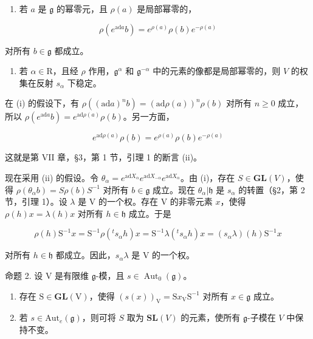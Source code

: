 \begin{enumerate}
\def\labelenumi{(\roman{enumi})}
\tightlist
\item
  若 \(a\) 是 \(\mathfrak{g}\) 的幂零元，且 \(\rho(a)\) 是局部幂零的，
\end{enumerate}

\[
\rho (e ^ {\mathrm{ad} a} b) = e ^ {\rho (a)} \rho (b) e ^ {- \rho (a)}
\]

对所有 \(b \in \mathfrak{g}\) 都成立。

\begin{enumerate}
\def\labelenumi{(\roman{enumi})}
\setcounter{enumi}{1}
\tightlist
\item
  若 \(\alpha \in \mathrm{R}\)，且经 \(\rho\) 作用，\(\mathfrak{g}^{\alpha}\) 和 \(\mathfrak{g}^{-\alpha}\) 中的元素的像都是局部幂零的，则 \(V\) 的权集在反射 \(s_{\alpha}\) 下稳定。
\end{enumerate}

在 (i) 的假设下，有 \(\rho((\mathrm{ad}a)^n b) = (\mathrm{ad}\rho(a))^n\rho(b)\) 对所有 \(n\geq 0\) 成立，所以 \(\rho(e^{\mathrm{ad}a}b) = e^{\mathrm{ad}\rho(a)}\rho(b)\)。另一方面，

\[
e ^ {\mathrm{ad} \rho (a)} \rho (b) = e ^ {\rho (a)} \rho (b) e ^ {- \rho (a)}
\]

这就是第 VII 章，§3，第 1 节，引理 1 的断言 (ii)。

现在采用 (ii) 的假设。令 \(\theta_{\alpha} = e^{\mathrm{ad}X_{\alpha}}e^{\mathrm{ad}X_{-\alpha}}e^{\mathrm{ad}X_{\alpha}}\)。由 (i)，存在 \(S\in \mathbf{GL}(V)\)，使得 \(\rho (\theta_{\alpha}b) = S\rho (b)S^{-1}\) 对所有 \(b\in \mathfrak{g}\) 成立。现在 \(\theta_{\alpha}|\mathfrak{h}\) 是 \(s_{\alpha}\) 的转置（§2，第 2 节，引理 1）。设 \(\lambda\) 是 V 的一个权。存在 V 的非零元素 \(x\)，使得 \(\rho (h)x = \lambda (h)x\) 对所有 \(h\in \mathfrak{h}\) 成立。于是

\[
\rho (h) \mathrm{S} ^ {- 1} x = \mathrm{S} ^ {- 1} \rho (^ {t} s _ {\alpha} h) x = \mathrm{S} ^ {- 1} \lambda (^ {t} s _ {\alpha} h) x = (s _ {\alpha} \lambda) (h) \mathrm{S} ^ {- 1} x
\]

对所有 \(h \in \mathfrak{h}\) 都成立。因此，\(s_{\alpha}\lambda\) 是 V 的一个权。

命题 2. 设 \(\mathrm{V}\) 是有限维 \(\mathfrak{g}\)-模，且 \(s \in \operatorname{Aut}_0(\mathfrak{g})\)。

\begin{enumerate}
\def\labelenumi{(\roman{enumi})}
\item
  存在 \(\mathrm{S} \in \mathbf{GL}(\mathrm{V})\)，使得 \((s(x))_{\mathrm{V}} = \mathrm{S}x_{\mathrm{V}}\mathrm{S}^{-1}\) 对所有 \(x \in \mathfrak{g}\) 成立。
\item
  若 \(s \in \mathrm{Aut}_e(\mathfrak{g})\)，则可将 \(S\) 取为 \(\mathbf{SL}(V)\) 的元素，使所有 \(\mathfrak{g}\)-子模在 \(V\) 中保持不变。
\end{enumerate}

